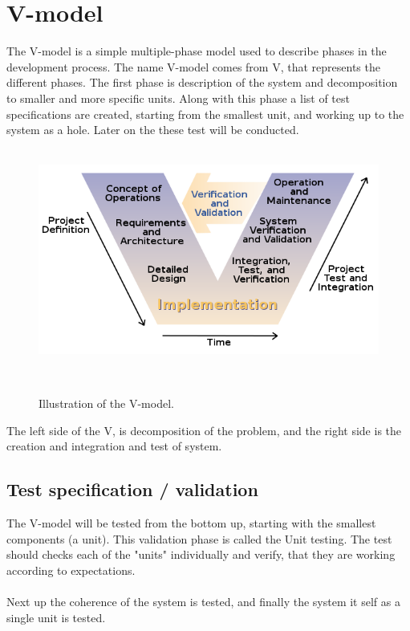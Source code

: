 \section{V-model}

%
%
%
%
%
%
%
%
%
%
%
%
%
%
%

The V-model is a simple multiple-phase model used to describe phases in the development process. 
The name V-model comes from V, that represents the different phases.
The first phase is description of the system and decomposition to smaller and more specific units.
Along with this phase a list of test specifications are created, starting from the smallest unit, and working up to the system as a hole.
Later on the these test will be conducted.
\\\\
\begin{figure}
\centering
\includegraphics[scale=0.5]{figures/20170215_V-model_image.png}
\caption{Illustration of the V-model. \cite{V-modelwiki}}\\ 
\end{figure}
The left side of the V, is decomposition of the problem, and the right side is the creation and integration and test of system.


\subsection{Test specification / validation}
The V-model will be tested from the bottom up, starting with the smallest components (a unit). This validation phase is called the Unit testing. The test should checks each of the "units" individually and verify, that they are working according to expectations. \\\\
Next up the coherence of the system is tested, and finally the system it self as a single unit is tested. 
\\\\

